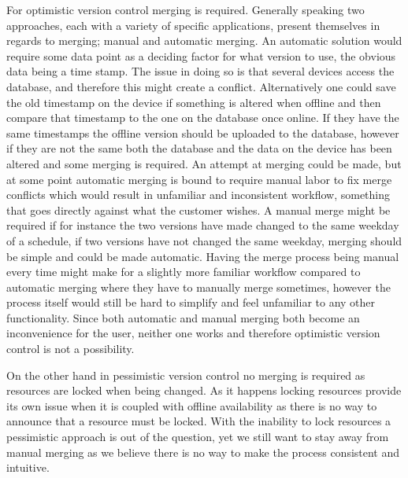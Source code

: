 For optimistic version control merging is required. 
Generally speaking two approaches, each with a variety of specific applications, present themselves in regards to merging; manual and automatic merging.
An automatic solution would require some data point as a deciding factor for what version to use, the obvious data being a time stamp.
The issue in doing so is that several devices access the database, and therefore this might create a conflict.
Alternatively one could save the old timestamp on the device if something is altered when offline and then compare that timestamp to the one on the database once online. 
If they have the same timestamps the offline version should be uploaded to the database, however if they are not the same both the database and the data on the device has been altered and some merging is required. 
An attempt at merging could be made, but at some point automatic merging is bound to require manual labor to fix merge conflicts which would result in unfamiliar and inconsistent workflow, something that goes directly against what the customer wishes.
A manual merge might be required if for instance the two versions have made changed to the same weekday of a schedule, if two versions have not changed the same weekday, merging should be simple and could be made automatic.
Having the merge process being manual every time might make for a slightly more familiar workflow compared to automatic merging where they have to manually merge sometimes, however the process itself would still be hard to simplify and feel unfamiliar to any other functionality. 
Since both automatic and manual merging both become an inconvenience for the user, neither one works and therefore optimistic version control is not a possibility.

\bigskip
On the other hand in pessimistic version control no merging is required as resources are locked when being changed.
As it happens locking resources provide its own issue when it is coupled with offline availability as there is no way to announce that a resource must be locked.
With the inability to lock resources a pessimistic approach is out of the question, yet we still want to stay away from manual merging as we believe there is no way to make the process consistent and intuitive.


